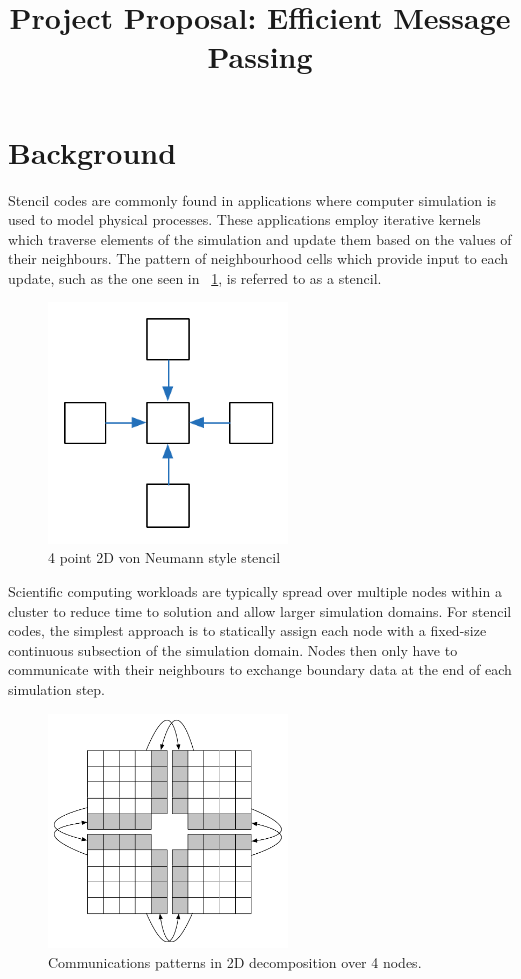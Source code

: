\documentclass[10pt, a4paper, conference]{IEEEtran}
\title{Project Proposal: Efficient Message Passing}
\author{
	\IEEEauthorblockN{Stephen I. Roberts}
	\IEEEauthorblockA{Department of Computer Science\\
					 The University of Warwick}
}
\date{}
\begin{document}
                                                                
\maketitle                                                                    

\section{Background}

Stencil codes are commonly found in applications where computer simulation is used to model physical processes. These applications employ iterative kernels which traverse elements of the simulation and update them based on the values of their neighbours. The pattern of neighbourhood cells which provide input to each update, such as the one seen in \figurename~\ref{fig:von_neumann_stencil}, is referred to as a stencil.

\begin{figure} 
\centering 
\includegraphics[width=2.5in]{graphics/2d_von_neumann_stencil.pdf}
    \caption{4 point 2D von Neumann style stencil}
    \label{fig:von_neumann_stencil}
\end{figure} 

Scientific computing workloads are typically spread over multiple nodes within a cluster to reduce time to solution and allow larger simulation domains. For stencil codes, the simplest approach is to statically assign each node with a fixed-size continuous subsection of the simulation domain. Nodes then only have to communicate with their neighbours to exchange boundary data at the end of each simulation step.

\begin{figure} 
\centering 
\includegraphics[width=2.5in]{graphics/2d2x2comms.pdf}
    \caption{Communications patterns in 2D decomposition over 4 nodes.}
    \label{fig:2dcp}
\end{figure}
\end{document}
